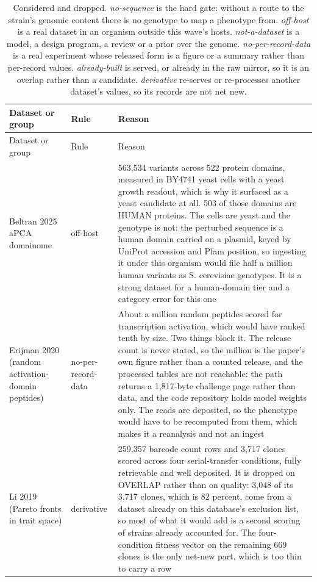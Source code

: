 \begingroup
\footnotesize
\begin{longtable}{@{}L{58mm} L{26mm} L{88mm}@{}}
\caption[]{Considered and dropped. \emph{no-sequence} is the hard gate: without a route
to the strain's genomic content there is no genotype to map a phenotype from.
\emph{off-host} is a real dataset in an organism outside this wave's hosts.
\emph{not-a-dataset} is a model, a design program, a review or a prior over the genome.
\emph{no-per-record-data} is a real experiment whose released form is a figure or a
summary rather than per-record values. \emph{already-built} is served, or already in the
raw mirror, so it is an overlap rather than a candidate. \emph{derivative} re-serves or
re-processes another dataset's values, so its records are not net new.}
\label{tab:excluded}\\
\toprule
Dataset or group & Rule & Reason \\
\midrule
\endfirsthead
\toprule
Dataset or group & Rule & Reason \\
\midrule
\endhead
\bottomrule
\endfoot
Beltran 2025 aPCA domainome & off-host & 563,534 variants across 522 protein domains, measured in BY4741 yeast cells with a yeast growth readout, which is why it surfaced as a yeast candidate at all. 503 of those domains are HUMAN proteins. The cells are yeast and the genotype is not: the perturbed sequence is a human domain carried on a plasmid, keyed by UniProt accession and Pfam position, so ingesting it under this organism would file half a million human variants as S. cerevisiae genotypes. It is a strong dataset for a human-domain tier and a category error for this one \\
\addlinespace[5pt]
Erijman 2020 (random activation-domain peptides) & no-per-record-data & About a million random peptides scored for transcription activation, which would have ranked tenth by size. Two things block it. The release count is never stated, so the million is the paper's own figure rather than a counted release, and the processed tables are not reachable: the path returns a 1,817-byte challenge page rather than data, and the code repository holds model weights only. The reads are deposited, so the phenotype would have to be recomputed from them, which makes it a reanalysis and not an ingest \\
\addlinespace[5pt]
Li 2019 (Pareto fronts in trait space) & derivative & 259,357 barcode count rows and 3,717 clones scored across four serial-transfer conditions, fully retrievable and well deposited. It is dropped on OVERLAP rather than on quality: 3,048 of its 3,717 clones, which is 82 percent, come from a dataset already on this database's exclusion list, so most of what it would add is a second scoring of strains already accounted for. The four-condition fitness vector on the remaining 669 clones is the only net-new part, which is too thin to carry a row \\

\end{longtable}

